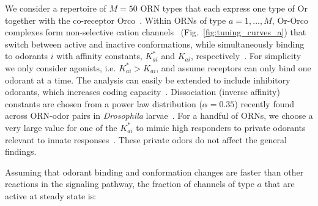 \documentclass[10pt,prl,aps,showpacs,twocolumn,unsortedaddress,showkeys,linenumbers]{revtex4-1}
\begin{document}
We consider a repertoire of $M=50$ ORN types that each express one type of Or together with the co-receptor Orco~\cite{Orco}. Within ORNs of type $a=1,...,M$, Or-Orco complexes form non-selective cation channels~\cite{orco_structure} (Fig.~\ref{fig:tuning_curves_a}) that switch between active and inactive conformations, while simultaneously binding to odorants $i$ with affinity constants, $K^*_{ai}$ and $K_{ai}$, respectively~\cite{nagel_wilson_biophysical,srinivas_elife}. For simplicity we only consider agonists, i.e. $K^*_{ai} > K_{ai}$, and assume receptors can only bind one odorant at a time. The analysis can easily be extended to include inhibitory odorants, which increases coding capacity~\cite{Cao_Tu_WL}. Dissociation (inverse affinity) constants are chosen from a power law distribution ($\alpha = 0.35$) recently found across ORN-odor pairs in \textit{Drosophila} larvae~\cite{si2017invariances}. For a handful of ORNs, we choose a very large value for one of the $K^*_{ai}$ to mimic high responders to private odorants relevant to innate responses~\cite{geosmin}. These private odors do not affect the general findings. 

Assuming that odorant binding and conformation changes are faster than other reactions in the signaling pathway, the fraction of channels of type $a$ that are active at steady state is:
\end{document}
